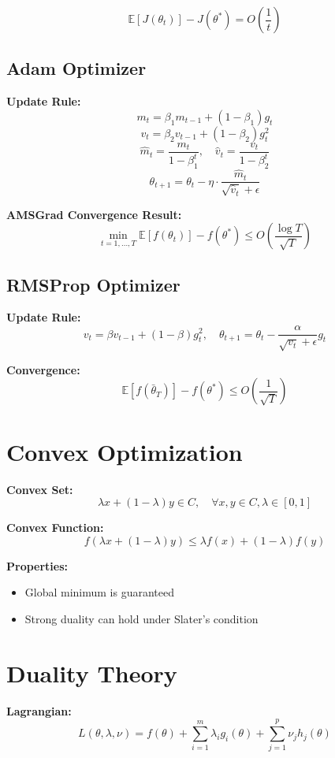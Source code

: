\documentclass[12pt]{article}
\begin{document}
\[
\mathbb{E}[J(\theta_t)] - J(\theta^*) = O\left(\frac{1}{t}\right)
\]

\subsection{Adam Optimizer}

\textbf{Update Rule:}
\[
m_t = \beta_1 m_{t-1} + (1 - \beta_1)g_t
\]
\[
v_t = \beta_2 v_{t-1} + (1 - \beta_2)g_t^2
\]
\[
\hat{m}_t = \frac{m_t}{1 - \beta_1^t}, \quad \hat{v}_t = \frac{v_t}{1 - \beta_2^t}
\]
\[
\theta_{t+1} = \theta_t - \eta \cdot \frac{\hat{m}_t}{\sqrt{\hat{v}_t} + \epsilon}
\]

\textbf{AMSGrad Convergence Result:}
\[
\min_{t=1,\dots,T} \mathbb{E}[f(\theta_t)] - f(\theta^*) \leq O\left(\frac{\log T}{\sqrt{T}}\right)
\]

\subsection{RMSProp Optimizer}

\textbf{Update Rule:}
\[
v_t = \beta v_{t-1} + (1 - \beta)g_t^2, \quad
\theta_{t+1} = \theta_t - \frac{\alpha}{\sqrt{v_t} + \epsilon}g_t
\]

\textbf{Convergence:}
\[
\mathbb{E}[f(\bar{\theta}_T)] - f(\theta^*) \leq O\left(\frac{1}{\sqrt{T}}\right)
\]

\section{Convex Optimization}

\textbf{Convex Set:}
\[
\lambda x + (1 - \lambda)y \in C, \quad \forall x, y \in C, \lambda \in [0, 1]
\]

\textbf{Convex Function:}
\[
f(\lambda x + (1 - \lambda)y) \leq \lambda f(x) + (1 - \lambda)f(y)
\]

\textbf{Properties:}
\begin{itemize}
    \item Global minimum is guaranteed
    \item Strong duality can hold under Slater’s condition
\end{itemize}

\section{Duality Theory}

\textbf{Lagrangian:}
\[
L(\theta, \lambda, \nu) = f(\theta) + \sum_{i=1}^{m} \lambda_i g_i(\theta) + \sum_{j=1}^{p} \nu_j h_j(\theta)
\]
\end{document}
